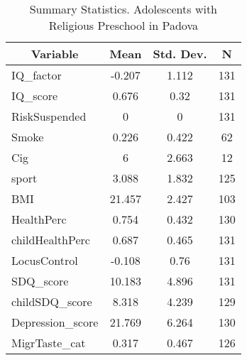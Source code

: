
\begin{table}[htbp]\centering \caption{Summary Statistics. Adolescents with Religious Preschool in Padova \label{bothAdolmaternaReliPadova}}
\begin{tabular}{l c c  c}\hline\hline
\multicolumn{1}{c}{\textbf{Variable}} & \textbf{Mean}
 & \textbf{Std. Dev.} & \textbf{N}\\ \hline
IQ\_factor & -0.207 & 1.112  & 131\\
IQ\_score & 0.676 & 0.32  & 131\\
RiskSuspended & 0 & 0  & 131\\
Smoke & 0.226 & 0.422  & 62\\
Cig & 6 & 2.663  & 12\\
sport & 3.088 & 1.832  & 125\\
BMI & 21.457 & 2.427  & 103\\
HealthPerc & 0.754 & 0.432  & 130\\
childHealthPerc & 0.687 & 0.465  & 131\\
LocusControl & -0.108 & 0.76  & 131\\
SDQ\_score & 10.183 & 4.896  & 131\\
childSDQ\_score & 8.318 & 4.239  & 129\\
Depression\_score & 21.769 & 6.264  & 130\\
MigrTaste\_cat & 0.317 & 0.467  & 126\\
\hline\end{tabular}
\end{table}
